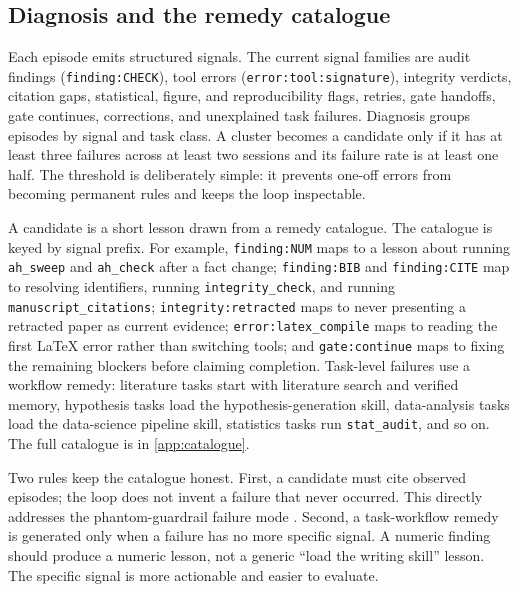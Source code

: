\subsection{Diagnosis and the remedy catalogue}
\label{sec:diagnosis}
Each episode emits structured signals. The current signal families are audit findings (\texttt{finding:CHECK}), tool errors (\texttt{error:tool:signature}), integrity verdicts, citation gaps, statistical, figure, and reproducibility flags, retries, gate handoffs, gate continues, corrections, and unexplained task failures. Diagnosis groups episodes by signal and task class. A cluster becomes a candidate only if it has at least three failures across at least two sessions and its failure rate is at least one half. The threshold is deliberately simple: it prevents one-off errors from becoming permanent rules and keeps the loop inspectable.

A candidate is a short lesson drawn from a remedy catalogue. The catalogue is keyed by signal prefix. For example, \texttt{finding:NUM} maps to a lesson about running \texttt{ah\_sweep} and \texttt{ah\_check} after a fact change; \texttt{finding:BIB} and \texttt{finding:CITE} map to resolving identifiers, running \texttt{integrity\_check}, and running \texttt{manuscript\_citations}; \texttt{integrity:retracted} maps to never presenting a retracted paper as current evidence; \texttt{error:latex\_compile} maps to reading the first \LaTeX{} error rather than switching tools; and \texttt{gate:continue} maps to fixing the remaining blockers before claiming completion. Task-level failures use a workflow remedy: literature tasks start with literature search and verified memory, hypothesis tasks load the hypothesis-generation skill, data-analysis tasks load the data-science pipeline skill, statistics tasks run \texttt{stat\_audit}, and so on. The full catalogue is in \cref{app:catalogue}.

Two rules keep the catalogue honest. First, a candidate must cite observed episodes; the loop does not invent a failure that never occurred. This directly addresses the phantom-guardrail failure mode \citep{wang2026phantom}. Second, a task-workflow remedy is generated only when a failure has no more specific signal. A numeric finding should produce a numeric lesson, not a generic ``load the writing skill'' lesson. The specific signal is more actionable and easier to evaluate.

